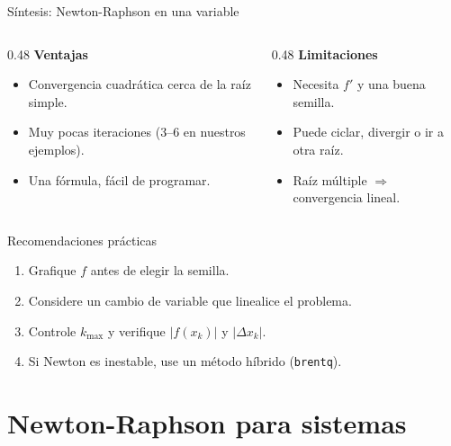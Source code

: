 \documentclass[aspectratio=169,11pt]{beamer}
\begin{document}
\begin{frame}{Síntesis: Newton-Raphson en una variable}
  \begin{columns}[T]
    \begin{column}{0.48\textwidth}
      \textbf{Ventajas}
      \begin{itemize}
        \item Convergencia \alert{cuadrática} cerca de la raíz simple.
        \item Muy pocas iteraciones (3--6 en nuestros ejemplos).
        \item Una fórmula, fácil de programar.
      \end{itemize}
    \end{column}
    \begin{column}{0.48\textwidth}
      \textbf{Limitaciones}
      \begin{itemize}
        \item Necesita $f'$ y una \alert{buena semilla}.
        \item Puede ciclar, divergir o ir a otra raíz.
        \item Raíz múltiple $\Rightarrow$ convergencia lineal.
      \end{itemize}
    \end{column}
  \end{columns}
  \bigskip
  \begin{block}{Recomendaciones prácticas}
    \begin{enumerate}
      \item Grafique $f$ antes de elegir la semilla.
      \item Considere un cambio de variable que linealice el problema.
      \item Controle $k_{\max}$ y verifique $|f(x_k)|$ y $|\Delta x_k|$.
      \item Si Newton es inestable, use un método híbrido (\texttt{brentq}).
    \end{enumerate}
  \end{block}
\end{frame}

\section{Newton-Raphson para sistemas}
\end{document}

